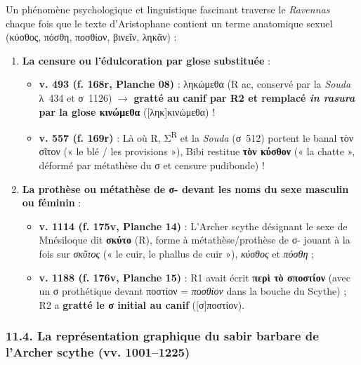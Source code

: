 \documentclass[11pt, a4paper, twoside]{article}
\renewcommand{\_}{\origunderscore\penalty0\relax}
\renewcommand{\texttt}[1]{#1}
\newcommand{\R}{\textbf{R}}
\newcommand{\Run}{\textbf{R}\textsuperscript{1}}
\newcommand{\Rac}{\textbf{R}\textsuperscript{ac}}
\newcommand{\Rdeux}{\textbf{R}\textsuperscript{2}}
\newcommand{\Bibi}{\textit{Bibi}}
\newcommand{\inRas}[2]{[\kern-0.15em[#1]\kern-0.15em]#2}
\def\R{R}%
\def\Run{R1}%
\def\Rac{R ac}%
\def\Rdeux{R2}%
\def\Bibi{Bibi}%
\def\inRas#1#2{[#1]#2}%
\begin{document}
Un phénomène psychologique et linguistique fascinant traverse le \textit{Ravennas} chaque fois que le texte d'Aristophane contient un terme anatomique sexuel (\texttt{κύσθος}, \texttt{πόσθη}, \texttt{ποσθίον}, \texttt{βινεῖν}, \texttt{ληκᾶν}) :
\begin{enumerate}[leftmargin=1.6em, itemsep=2pt]
  \item \textbf{La censure ou l'édulcoration par glose substituée} :
  \begin{itemize}[leftmargin=1.5em, itemsep=2pt]
    \item \textbf{v. 493 (\texttt{f. 168r}, Planche 08)} : \texttt{ληκώμεθα} (\Rac{}, conservé par la \textit{Souda} λ~434 et σ~1126) $\to$ \textbf{gratté au canif par \Rdeux{} et remplacé \textit{in rasura} par la glose \texttt{κινώμεθα}} (\texttt{\inRas{ληκ}{κιν}ώμεθα}) !
    \item \textbf{v. 557 (\texttt{f. 169r})} : Là où \R{}, Σ\textsuperscript{R} et la \textit{Souda} (σ~512) portent le banal \texttt{τὸν σῖτον} (« le blé / les provisions »), \Bibi{} restitue \textbf{\texttt{τὸν κύσθον}} (« la chatte », déformé par métathèse du σ et censure pudibonde) !
  \end{itemize}
  \item \textbf{La prothèse ou métathèse de σ- devant les noms du sexe masculin ou féminin} :
  \begin{itemize}[leftmargin=1.5em, itemsep=2pt]
    \item \textbf{v. 1114 (\texttt{f. 175v}, Planche 14)} : L'Archer scythe désignant le sexe de Mnésiloque dit \textbf{\texttt{σκύτο}} (\R{}), forme à métathèse/prothèse de σ- jouant à la fois sur \textit{σκῦτος} (« le cuir, le phallus de cuir »), \textit{κύσθος} et \textit{πόσθη} ;
    \item \textbf{v. 1188 (\texttt{f. 176v}, Planche 15)} : \Run{} avait écrit \textbf{\texttt{περὶ τὸ σποστίον}} (avec un σ prothétique devant \texttt{ποστίον} = \textit{ποσθίον} dans la bouche du Scythe) ; \Rdeux{} a \textbf{gratté le σ initial au canif} (\texttt{\inRas{σ}{}ποστίον}).
  \end{itemize}
\end{enumerate}


\subsubsection{11.4. La représentation graphique du sabir barbare de l'Archer scythe (\texttt{vv. 1001–1225})}
\end{document}

